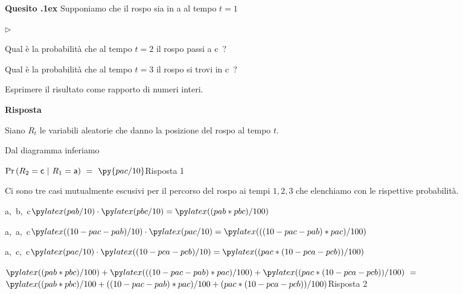 \documentclass[11pt,twoside,a4paper]{article}
\newcommand{\mylabel}[1]{#1\hfill}
\renewenvironment{itemize}
  {\begin{list}{$\triangleright$}{%
   \setlength{\parskip}{0mm}
   \setlength{\topsep}{.4\baselineskip}
   \setlength{\rightmargin}{0mm}
   \setlength{\listparindent}{0mm}
   \setlength{\itemindent}{0mm}
   \setlength{\labelwidth}{2ex}
   \setlength{\itemsep}{.4\baselineskip}
   \setlength{\parsep}{0mm}
   \setlength{\partopsep}{0mm}
   \setlength{\labelsep}{1ex}
   \setlength{\leftmargin}{\labelwidth+\labelsep}
   \let\makelabel\mylabel}}{%
   \end{list}\vspace*{-1.3mm}}
\newcounter{quesito}
\newenvironment{xquestion}{\bigskip\addtocounter{quesito}{1}\bigskip\bigskip\par\textbf{Quesito \thequesito.\kern1ex}}{\vspace{\parskip}}
\newenvironment{answer}{\par\textbf{Risposta\quad}}{\vspace{\parskip}}
\begin{document}
\begin{xquestion}
Supponiamo che il rospo sia in {\sf a} al tempo $t=1$ 

\begin{itemize}
\item[1.] Qual è la probabilità che al tempo $t=2$ il rospo passi a {\sf c}~?

\item[3.] Qual è la probabilità che al tempo $t=3$ il rospo si trovi in {\sf c}~?

\end{itemize}

Esprimere il risultato come rapporto di numeri interi.

\begin{answer}

Siano $R_t$ le variabili aleatorie che danno la posizione del rospo al tempo $t$.

Dal diagramma inferiamo 

$\Pr(R_{2}={\sf c}~|~R_1={\sf a})\ =\kern1.2ex${\color{blue}$\py{pac/10}$\hfill Risposta 1}


Ci sono tre casi mutualmente escusivi per il percorso del rospo ai tempi $1,2,3$ 
che elenchiamo con le rispettive probabilità.

{\sf a,\ b,\ c}\hfill$\pyl{pab/10}\cdot\pyl{pbc/10} = \pyl{(pab * pbc) / 100}$

{\sf a,\ a,\ c}\hfill$\pyl{(10-pac-pab)/10}\cdot\pyl{pac/10} = \pyl{((10-pac-pab) * pac)/100}$

{\sf a,\ c,\ c}\hfill$\pyl{pac/10}\cdot\pyl{(10-pca-pcb)/10} = \pyl{(pac * (10-pca-pcb))/100}$


$\pyl{(pab * pbc) / 100} + \pyl{((10-pac-pab) * pac)/100} +  \pyl{(pac * (10-pca-pcb))/100} 
\ =\ $
{\color{blue}$\pyl{ (pab * pbc) / 100 + ((10-pac-pab) * pac)/100 +  (pac * (10-pca-pcb))/100}$\hfill Risposta 2}

\end{answer}
\end{xquestion}
  
  
\end{document}
